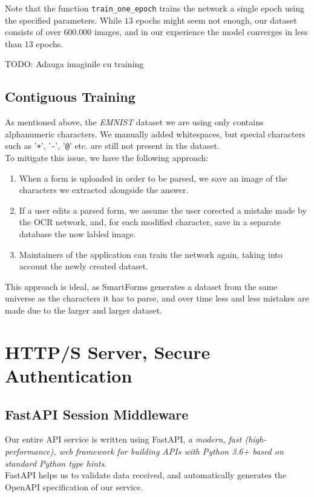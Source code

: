 \documentclass[12pt, a4paper]{report}
\def\code#1{\texttt{#1}}
\begin{document}
Note that the function \code{train\_one\_epoch} trains the network a single epoch using the specified parameters. While $13$ epochs might seem not enough, our dataset consists of over $600.000$ images, and in our experience the model converges in less than $13$ epochs.

TODO: Adauga imaginile cu training

\section{Contiguous Training}

As mentioned above, the \textit{EMNIST} dataset we are using only contains alphanumeric characters. We manually added whitespaces, but special characters such as '\code{+}', '\code{-}', '\code{@}' etc. are still not present in the dataset.
\\
To mitigate this issue, we have the following approach:
\begin{enumerate}
	\item When a form is uploaded in order to be parsed, we save an image of the characters we extracted alongside the answer.
	\item If a user edits a parsed form, we assume the user corected a mistake made by the OCR network, and, for each modified character, save in a separate database the now labled image.
	\item Maintainers of the application can train the network again, taking into account the newly created dataset.
\end{enumerate}

This approach is ideal, as SmartForms generates a dataset from the same universe as the characters it has to parse, and over time less and less mistakes are made due to the larger and larger dataset.

\chapter{HTTP/S Server, Secure Authentication}

\section{FastAPI Session Middleware}

Our entire API service is written using FastAPI, \textit{a modern, fast (high-performance), web framework for building APIs with Python 3.6+ based on standard Python type hints}\cite{FastAPI}.
\\
FastAPI helps us to validate data received, and automatically generates the OpenAPI\cite{open-api} specification of our service.
\end{document}
